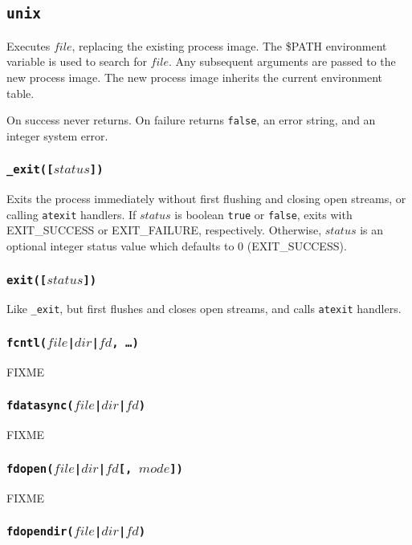 \documentclass[11pt, oneside]{memoir}
\newcommand*{\true}[0]{\texttt{true}\xspace}
\newcommand*{\false}[0]{\texttt{false}\xspace}
\newcommand*{\syscall}[1]{\texttt{#1}\xspace}
\newcommand*{\fn}[1]{\texttt{#1}\xspace}
\newcounter{toccols}
\newenvironment{Module}[1]{
	\subsection{\texttt{#1}}
	\addtocontents{toc}{
		\protect\begin{multicols}{\value{toccols}}
	}
}{
	\addtocontents{toc}{\protect\end{multicols}}
}
\begin{document}
\begin{Module}{unix}
Executes $file$, replacing the existing process image. The \$PATH environment variable is used to search for $file$. Any subsequent arguments are passed to the new process image. The new process image inherits the current environment table.

On success never returns. On failure returns \false, an error string, and an integer system error.

\subsubsection[\fn{\_exit}]{\fn{\_exit([$status$])}}

Exits the process immediately without first flushing and closing open streams, or calling \syscall{atexit} handlers. If $status$ is boolean \true or \false, exits with EXIT\_SUCCESS or EXIT\_FAILURE, respectively. Otherwise, $status$ is an optional integer status value which defaults to 0 (EXIT\_SUCCESS).

\subsubsection[\fn{exit}]{\fn{exit([$status$])}}

Like \fn{\_exit}, but first flushes and closes open streams, and calls \syscall{atexit} handlers.

\subsubsection[\fn{fcntl}]{\fn{fcntl($file$|$dir$|$fd$, \ldots)}}

FIXME

\subsubsection[\fn{fdatasync}]{\fn{fdatasync($file$|$dir$|$fd$)}}

FIXME

\subsubsection[\fn{fdopen}]{\fn{fdopen($file$|$dir$|$fd$[, $mode$])}}

FIXME

\subsubsection[\fn{fdopendir}]{\fn{fdopendir($file$|$dir$|$fd$)}}


\end{Module}
\end{document}
